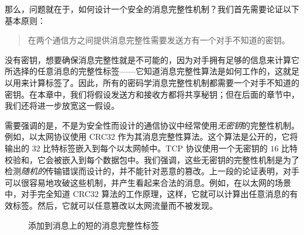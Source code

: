 那么，问题就在于，如何设计一个安全的消息完整性机制？我们首先需要论证以下基本原则：
\begin{quote}
在两个通信方之间提供消息完整性需要发送方有一个对手不知道的密钥。
\end{quote}
没有密钥，想要确保消息完整性就是不可能的，因为对手拥有足够的信息来计算它所选择的任意消息的完整性标签——它知道消息完整性算法是如何工作的，这就足以用来计算标签了。因此，所有的密码学消息完整性机制都需要一个对手不知道的密钥。在本章中，我们将假设发送方和接收方都将共享秘钥；但在后面的章节中，我们还将进一步放宽这一假设。

需要强调的是，不是为安全性而设计的通信协议中经常使用\emph{无密钥}的完整性机制。例如，以太网协议使用 CRC32 作为其消息完整性算法。这个算法是公开的，它将输出的 $32$ 比特标签嵌入到每个以太网帧中。TCP 协议使用一个无密钥的 $16$ 比特校验和，它会被嵌入到每个数据包中。我们强调，这些无密钥的完整性机制是为了检测\emph{随机的}传输错误而设计的，并不能针对恶意的篡改。上一段的论证表明，对手可以很容易地攻破这些机制，并产生看起来合法的消息。例如，在以太网的场景中，对手完全知道 CRC32 算法的工作原理，这样，它就可以计算出任意消息的有效标签。然后，它就可以任意篡改以太网流量而不被发现。

\begin{figure}
  \centering
  
  \caption{添加到消息上的短的消息完整性标签}
  \label{fig:6-1}
\end{figure}















